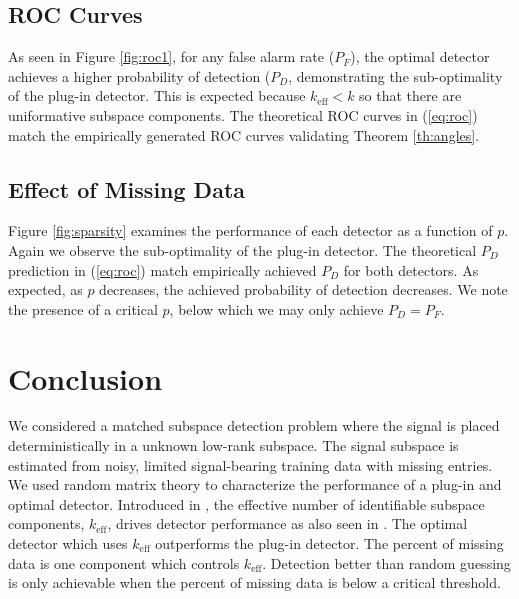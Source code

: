 \subsection{ROC Curves}

As seen in Figure \ref{fig:roc1}, for any false alarm rate ($P_F$), the optimal detector achieves a higher probability of detection ($P_D$, demonstrating the sub-optimality of the plug-in detector. This is expected because $k_\text{eff}<k$ so that there are uniformative subspace components. The theoretical ROC curves in (\ref{eq:roc}) match the empirically generated ROC curves validating Theorem \ref{th:angles}.

\subsection{Effect of Missing Data}
Figure \ref{fig:sparsity} examines the performance of each detector as a function of $p$. Again we observe the sub-optimality of the plug-in detector. The theoretical $P_D$ prediction in (\ref{eq:roc}) match empirically achieved $P_D$ for both detectors. As expected, as $p$ decreases, the achieved probability of detection decreases. We note the presence of a critical $p$, below which we may only achieve $P_D=P_F$.


\section{Conclusion}\label{sec:conclusion}

We considered a matched subspace detection problem where the signal is placed deterministically in a unknown low-rank subspace. The signal subspace is estimated from noisy, limited signal-bearing training data with missing entries.  We used random matrix theory to characterize the performance of a plug-in and optimal detector. Introduced in \cite{nadakuditi2008sample}, the effective number of identifiable subspace components, $k_\text{eff}$, drives detector performance as also seen in \cite{asendorf2011msd}. The optimal detector which uses $k_\text{eff}$ outperforms the plug-in detector. The percent of missing data is one component which controls $k_\text{eff}$. Detection better than random guessing is only achievable when the percent of missing data is below a critical threshold. 